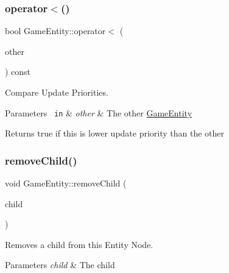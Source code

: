 \subsubsection{\texorpdfstring{operator$<$()}{operator<()}}
{\footnotesize\ttfamily bool Game\+Entity\+::operator$<$ (\begin{DoxyParamCaption}\item[{const \mbox{\hyperlink{class_game_entity}{Game\+Entity}} \&}]{other }\end{DoxyParamCaption}) const\hspace{0.3cm}{\ttfamily [inline]}}



Compare Update Priorities. 


\begin{DoxyParams}[1]{Parameters}
\mbox{\texttt{ in}}  & {\em other} & The other \mbox{\hyperlink{class_game_entity}{Game\+Entity}}\\
\hline
\end{DoxyParams}
\begin{DoxyReturn}{Returns}
true if this is lower update priority than the other 
\end{DoxyReturn}
\mbox{\label{class_game_entity_a68a209e6f5e4626cd8b892ca2f999f06}} 
\subsubsection{\texorpdfstring{removeChild()}{removeChild()}}
{\footnotesize\ttfamily void Game\+Entity\+::remove\+Child (\begin{DoxyParamCaption}\item[{\mbox{\hyperlink{class_game_entity}{Game\+Entity}} $\ast$}]{child }\end{DoxyParamCaption})\hspace{0.3cm}{\ttfamily [inline]}}



Removes a child from this Entity Node. 


\begin{DoxyParams}{Parameters}
{\em child} & The child \\
\hline
\end{DoxyParams}
\mbox{\label{class_game_entity_a3724480e4515bc3691c87de65de2345e}} 
